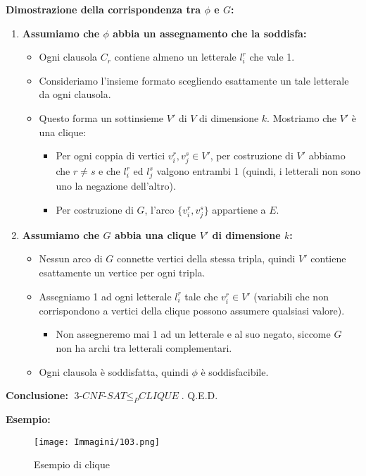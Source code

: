 \documentclass{article}
\begin{document}
\textbf{Dimostrazione della corrispondenza tra $\phi$ e $G$:}
\begin{enumerate}
    \item \textbf{Assumiamo che $\phi$ abbia un assegnamento che la soddisfa:}
    \begin{itemize}
        \item Ogni clausola $C_r$ contiene almeno un letterale $l_i^r$ che vale 1.
        \item Consideriamo l’insieme formato scegliendo esattamente un tale letterale da ogni clausola.
        \item Questo forma un sottinsieme $V'$ di $V$ di dimensione $k$. Mostriamo che $V'$ è una clique:
        \begin{itemize}
            \item Per ogni coppia di vertici $v_i^r, v_j^s \in V'$, per costruzione di $V'$ abbiamo che $r \neq s$ e che $l_i^r$ ed $l_j^s$ valgono entrambi 1 (quindi, i letterali non sono uno la negazione dell’altro).
            \item Per costruzione di $G$, l’arco $\{v_i^r, v_j^s\}$ appartiene a $E$.
        \end{itemize}
    \end{itemize}
    
    \item \textbf{Assumiamo che $G$ abbia una clique $V'$ di dimensione $k$:}
    \begin{itemize}
        \item Nessun arco di $G$ connette vertici della stessa tripla, quindi $V'$ contiene esattamente un vertice per ogni tripla.
        \item Assegniamo 1 ad ogni letterale $l_i^r$ tale che $v_i^r \in V'$ (variabili che non corrispondono a vertici della clique possono assumere qualsiasi valore).
        \begin{itemize}
            \item Non assegneremo mai 1 ad un letterale e al suo negato, siccome $G$ non ha archi tra letterali complementari.
        \end{itemize}
        \item Ogni clausola è soddisfatta, quindi $\phi$ è soddisfacibile.
    \end{itemize}
\end{enumerate}
\textbf{Conclusione:} $\textit{3-CNF-SAT} \leq_P \textit{CLIQUE}$. Q.E.D.

\textbf{Esempio:}
\begin{figure}[H]
    \centering
    \texttt{[image: Immagini/103.png]}
    \caption{Esempio di clique}
    \label{fig:clique-example-2}
\end{figure}
\end{document}
